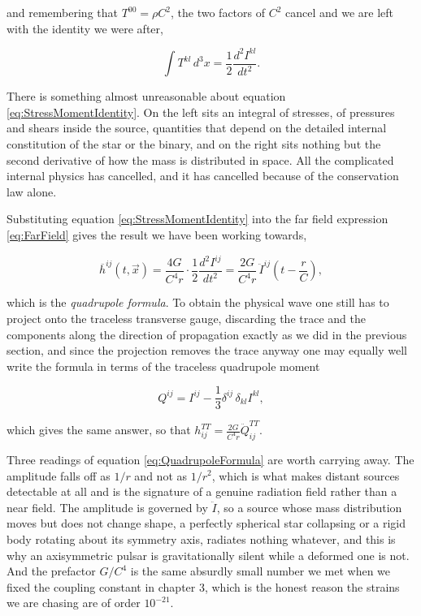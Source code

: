         and remembering that $T^{00}=\rho C^2$, the two factors of $C^2$ cancel and we are left with the identity we were after,

        \begin{equation}\label{eq:StressMomentIdentity}
            \int T^{kl}\,d^3x = \frac{1}{2}\frac{d^2I^{kl}}{dt^2}.
        \end{equation}

        There is something almost unreasonable about equation \ref{eq:StressMomentIdentity}. On the left sits an integral of stresses, of pressures and shears inside the source, quantities that depend on the detailed internal constitution of the star or the binary, and on the right sits nothing but the second derivative of how the mass is distributed in space. All the complicated internal physics has cancelled, and it has cancelled because of the conservation law alone.

        Substituting equation \ref{eq:StressMomentIdentity} into the far field expression \ref{eq:FarField} gives the result we have been working towards,

        \begin{equation}\label{eq:QuadrupoleFormula}
            \overline{h}^{ij}(t,\Vec{x}) = \frac{4G}{C^4r}\cdot\frac{1}{2}\frac{d^2I^{ij}}{dt^2} = \frac{2G}{C^4r}\,\ddot{I}^{ij}\left(t-\frac{r}{C}\right),
        \end{equation}

        which is the \textit{quadrupole formula}. To obtain the physical wave one still has to project onto the traceless transverse gauge, discarding the trace and the components along the direction of propagation exactly as we did in the previous section, and since the projection removes the trace anyway one may equally well write the formula in terms of the traceless quadrupole moment

        \begin{equation}
            Q^{ij} = I^{ij} - \frac{1}{3}\delta^{ij}\,\delta_{kl}I^{kl},
        \end{equation}

        which gives the same answer, so that $h^{TT}_{ij} = \frac{2G}{C^4r}\ddot{Q}^{TT}_{ij}$.

        Three readings of equation \ref{eq:QuadrupoleFormula} are worth carrying away. The amplitude falls off as $1/r$ and not as $1/r^2$, which is what makes distant sources detectable at all and is the signature of a genuine radiation field rather than a near field. The amplitude is governed by $\ddot{I}$, so a source whose mass distribution moves but does not change shape, a perfectly spherical star collapsing or a rigid body rotating about its symmetry axis, radiates nothing whatever, and this is why an axisymmetric pulsar is gravitationally silent while a deformed one is not. And the prefactor $G/C^4$ is the same absurdly small number we met when we fixed the coupling constant in chapter 3, which is the honest reason the strains we are chasing are of order $10^{-21}$.

